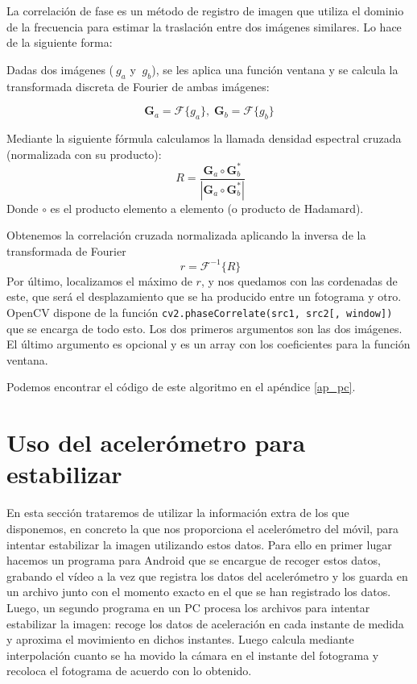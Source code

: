 \documentclass[a4paper,openright, 12pt]{book}
\begin{document}
La correlación de fase es un método de registro de imagen que utiliza el dominio de la frecuencia para estimar la traslación entre dos imágenes similares. Lo hace de la siguiente forma:


Dadas dos imágenes ($\ g_a$ y $\ g_b$), se les aplica una función ventana y se calcula la transformada discreta de Fourier de ambas imágenes:
  
\begin{equation*} 
    \mathbf{G}_a = \mathcal{F}\{g_a\}, \; \mathbf{G}_b = \mathcal{F}\{g_b\}
\end{equation*}

Mediante la siguiente fórmula calculamos la llamada densidad espectral cruzada (normalizada con su producto):
\begin{equation*}
   \ R = \frac{ \mathbf{G}_a \circ \mathbf{G}_b^*}{|\mathbf{G}_a \circ \mathbf{G}_b^*|}
\end{equation*}
Donde $\circ$ es el producto elemento a elemento (o producto de Hadamard).

Obtenemos la correlación cruzada normalizada aplicando la inversa de la transformada de Fourier
\begin{equation*}
    \ r = \mathcal{F}^{-1}\{R\}
\end{equation*}
Por último, localizamos el máximo de $r$, y nos quedamos con las cordenadas de este, que será el desplazamiento que se ha producido entre un fotograma y otro.
OpenCV dispone de la función \lstinline|cv2.phaseCorrelate(src1, src2[, window])| que se encarga de todo esto. Los dos primeros argumentos son las dos imágenes. El último argumento es opcional y es un array con los coeficientes para la función ventana.

Podemos encontrar el código de este algoritmo en el apéndice \ref{ap_pc}.
\newpage
\section{Uso del acelerómetro para estabilizar}
En esta sección trataremos de utilizar la información extra de los que disponemos, en concreto la que nos proporciona el acelerómetro del móvil, para intentar estabilizar la imagen utilizando estos datos.
Para ello en primer lugar hacemos un programa para Android que se encargue de recoger estos datos, grabando el vídeo a la vez que registra los datos del acelerómetro y los guarda en un archivo junto con el momento exacto en el que se han registrado los datos.
Luego, un segundo programa en un PC procesa los archivos para intentar estabilizar la imagen: recoge los datos de aceleración en cada instante de medida y aproxima el movimiento en dichos instantes. Luego calcula mediante interpolación cuanto se ha movido la cámara en el instante del fotograma y recoloca el fotograma de acuerdo con lo obtenido.
\end{document}
